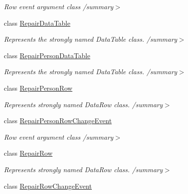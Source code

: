 \begin{DoxyCompactItemize}
\begin{DoxyCompactList}\small\item\em Row event argument class /summary$>$ \end{DoxyCompactList}\item 
class \hyperlink{class_env_int_1_1_win32_1_1_field_tech_1_1_manager_1_1_data_sets_1_1_guide_ware_mobile_data_set_1_1_repair_data_table}{Repair\+Data\+Table}
\begin{DoxyCompactList}\small\item\em Represents the strongly named Data\+Table class. /summary$>$ \end{DoxyCompactList}\item 
class \hyperlink{class_env_int_1_1_win32_1_1_field_tech_1_1_manager_1_1_data_sets_1_1_guide_ware_mobile_data_set_1_1_repair_person_data_table}{Repair\+Person\+Data\+Table}
\begin{DoxyCompactList}\small\item\em Represents the strongly named Data\+Table class. /summary$>$ \end{DoxyCompactList}\item 
class \hyperlink{class_env_int_1_1_win32_1_1_field_tech_1_1_manager_1_1_data_sets_1_1_guide_ware_mobile_data_set_1_1_repair_person_row}{Repair\+Person\+Row}
\begin{DoxyCompactList}\small\item\em Represents strongly named Data\+Row class. /summary$>$ \end{DoxyCompactList}\item 
class \hyperlink{class_env_int_1_1_win32_1_1_field_tech_1_1_manager_1_1_data_sets_1_1_guide_ware_mobile_data_set_9c921e67e64bbad224f4e7d364257dc3}{Repair\+Person\+Row\+Change\+Event}
\begin{DoxyCompactList}\small\item\em Row event argument class /summary$>$ \end{DoxyCompactList}\item 
class \hyperlink{class_env_int_1_1_win32_1_1_field_tech_1_1_manager_1_1_data_sets_1_1_guide_ware_mobile_data_set_1_1_repair_row}{Repair\+Row}
\begin{DoxyCompactList}\small\item\em Represents strongly named Data\+Row class. /summary$>$ \end{DoxyCompactList}\item 
class \hyperlink{class_env_int_1_1_win32_1_1_field_tech_1_1_manager_1_1_data_sets_1_1_guide_ware_mobile_data_set_1_1_repair_row_change_event}{Repair\+Row\+Change\+Event}

\end{DoxyCompactItemize}
